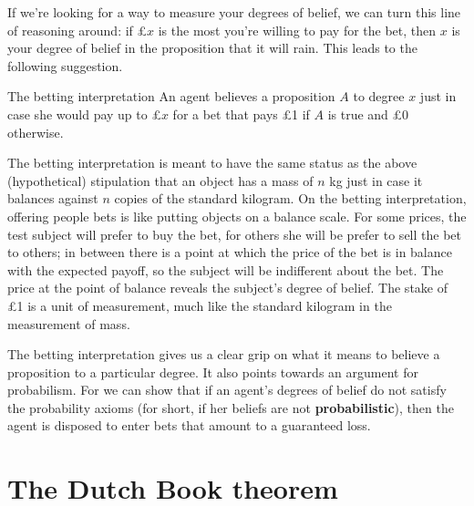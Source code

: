If we're looking for a way to measure your degrees of belief, we can
turn this line of reasoning around: if £$x$ is the most you're willing
to pay for the bet, then $x$ is your degree of belief in the
proposition that it will rain. This leads to the
following suggestion.

\begin{genericthm}{The betting interpretation}
  An agent believes a proposition $A$ to degree $x$ just in case she
  would pay up to £$x$ for a bet that pays £1 if $A$ is true and £0
  otherwise.
\end{genericthm}

The betting interpretation is meant to have the same status as the
above (hypothetical) stipulation that an object has a mass of $n$ kg
just in case it balances against $n$ copies of the standard kilogram.
On the betting interpretation, offering people bets is like putting
objects on a balance scale. For some prices, the test subject will
prefer to buy the bet, for others she will be prefer to sell the bet
to others; in between there is a point at which the price of the bet
is in balance with the expected payoff, so the subject will be
indifferent about the bet. The price at the point of balance reveals
the subject's degree of belief. The stake of £1 is a unit of
measurement, much like the standard kilogram in the measurement of
mass.


The betting interpretation gives us a clear grip on what it means to
believe a proposition to a particular degree. It also points towards
an argument for probabilism. For we can show that if an agent's
degrees of belief do not satisfy the probability axioms (for short, if
her beliefs are not \textbf{probabilistic}), then the agent is
disposed to enter bets that amount to a guaranteed loss.

\section{The Dutch Book theorem}

